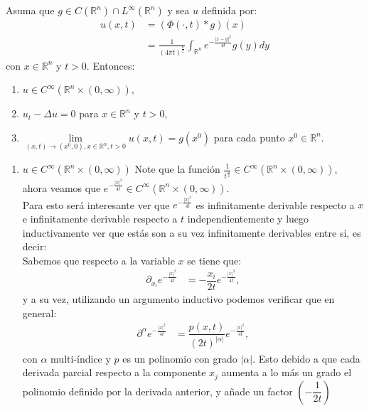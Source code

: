 \begin{homeworkProblem}
  \begin{teorema}
    Asuma que $g\in C(\mathbb{R}^{n})\cap L^{\infty}(\mathbb{R}^{n})$ y sea $u$ definida por:
    \begin{align*}
      u(x,t)&=(\Phi(\cdot,t)*g)(x)\\
      &=\frac{1}{(4\pi t)^{\frac{n}{2}}}\int_{\mathbb{R}^{n}}e^{-\frac{|x-y|^2}{4t}}g(y)dy
    \end{align*}
    con $x\in\mathbb{R}^{n}$ y $t>0$.
    Entonces:
    \begin{enumerate}
      \item $u\in C^{\infty}(\mathbb{R}^{n}\times (0,\infty))$,
      \item $u_t-\Delta u=0$ para $x\in\mathbb{R}^{n}$ y $t>0$,
      \item $\underset{(x,t)\rightarrow(x^0,0),x\in\mathbb{R}^{n},t>0}{\lim}u(x,t)=g(x^0)$ para cada punto $x^0\in\mathbb{R}^{n}$. 
    \end{enumerate}
  \end{teorema}
  \begin{solucion}
    \begin{enumerate}
      \item $u\in C^{\infty}(\mathbb{R}^{n}\times (0,\infty))$
        Note que la función $\frac{1}{t^{\frac{n}{2}}}\in C^{\infty}(\mathbb{R}^{n}\times (0,\infty))$, ahora veamos que $e^{-\frac{|x|^2}{4t}}\in C^{\infty}(\mathbb{R}^{n}\times (0,\infty))$.\\
        Para esto será interesante ver que $e^{-\frac{|x|^2}{4t}}$ es infinitamente derivable respecto a $x$ e infinitamente derivable respecto a $t$ independientemente y luego inductivamente ver que estás son a su vez infinitamente derivables entre si, es decir:\\
        Sabemos que respecto a la variable $x$ se tiene que:
        \begin{align*}
         \partial_{x_i}e^{-\frac{|x|^2}{4t}}&=-\dfrac{x_i}{2t}e^{-\frac{|x|^2}{4t}},
        \end{align*}
        y a su vez, utilizando un argumento inductivo podemos verificar que en general:
        \begin{align*}
          \partial^{\alpha}e^{-\frac{|x|^2}{4t}}&=\dfrac{p(x,t)}{(2t)^{|\alpha|}}e^{-\frac{|x|^2}{4t}},
        \end{align*}
        con $\alpha$ multi-índice y $p$ es un polinomio con grado $|\alpha|$. Esto debido a que cada derivada parcial respecto a la componente $x_{j}$ aumenta a lo más un grado el polinomio definido por la derivada anterior, y añade un factor $\left(-\dfrac{1}{2t}\right)$ \\

\end{enumerate}
\end{solucion}
\end{homeworkProblem}
